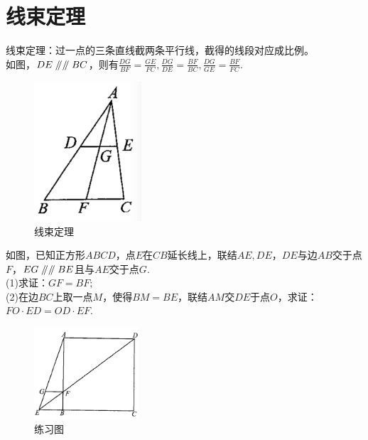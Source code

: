 \documentclass{ecnuthesis}
\newcommand\px{\mathrel{/\mkern-5mu/}}  %
\begin{document}
\section{线束定理}
\begin{model}
    线束定理：过一点的三条直线截两条平行线，截得的线段对应成比例。\\
    如图，$DE\px \px BC$，则有$\frac{DG}{BF}=\frac{GE}{FC},\frac{DG}{DE}=\frac{BF}{BC},\frac{DG}{GE}=\frac{BF}{FC}.$
\end{model}
\begin{figure}[H]
\centering
\includegraphics[width=4cm]{picture/817.png}
\caption{线束定理}
\end{figure}
\begin{problem}
    如图，已知正方形$ABCD$，点$E$在$CB$延长线上，联结$AE,DE$，$DE$与边$AB$交于点$F$，$EG\px \px BE$且与$AE$交于点$G.$ \\
    (1)求证：$GF=BF$; \\
    (2)在边$BC$上取一点$M$，使得$BM=BE$，联结$AM$交$DE$于点$O$，求证：$FO·ED=OD·EF.$ \\
\end{problem}
\begin{figure}[H]
\centering
\includegraphics[width=4cm]{picture/818.png}
\caption{练习图}
\end{figure}
\clearpage
\end{document}
